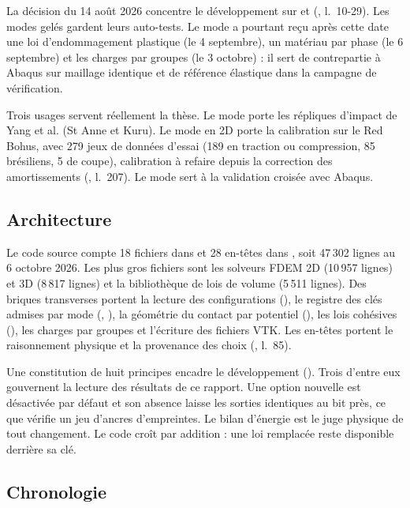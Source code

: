 La décision du 14 août 2026 concentre le développement sur  et  (, l.~10-29). Les modes gelés gardent leurs auto-tests. Le mode  a pourtant reçu après cette date une loi d'endommagement plastique (le 4 septembre), un matériau par phase (le 6 septembre) et les charges par groupes (le 3 octobre) : il sert de contrepartie à Abaqus sur maillage identique et de référence élastique dans la campagne de vérification.

Trois usages servent réellement la thèse. Le mode  porte les répliques d'impact de Yang et al. (St Anne et Kuru). Le mode  en 2D porte la calibration sur le Red Bohus, avec 279 jeux de données d'essai (189 en traction ou compression, 85 brésiliens, 5 de coupe), calibration à refaire depuis la correction des amortissements (, l.~207). Le mode  sert à la validation croisée avec Abaqus.

\subsection{Architecture}

Le code source compte 18 fichiers dans  et 28 en-têtes dans , soit 47\,302 lignes au 6 octobre 2026. Les plus gros fichiers sont les solveurs FDEM 2D (10\,957 lignes) et 3D (8\,817 lignes) et la bibliothèque de lois de volume  (5\,511 lignes). Des briques transverses portent la lecture des configurations (), le registre des clés admises par mode (, ), la géométrie du contact par potentiel (), les lois cohésives (), les charges par groupes et l'écriture des fichiers VTK. Les en-têtes portent le raisonnement physique et la provenance des choix (, l.~85).

Une constitution de huit principes encadre le développement (). Trois d'entre eux gouvernent la lecture des résultats de ce rapport. Une option nouvelle est désactivée par défaut et son absence laisse les sorties identiques au bit près, ce que vérifie un jeu d'ancres d'empreintes. Le bilan d'énergie est le juge physique de tout changement. Le code croît par addition : une loi remplacée reste disponible derrière sa clé.

\subsection{Chronologie}


